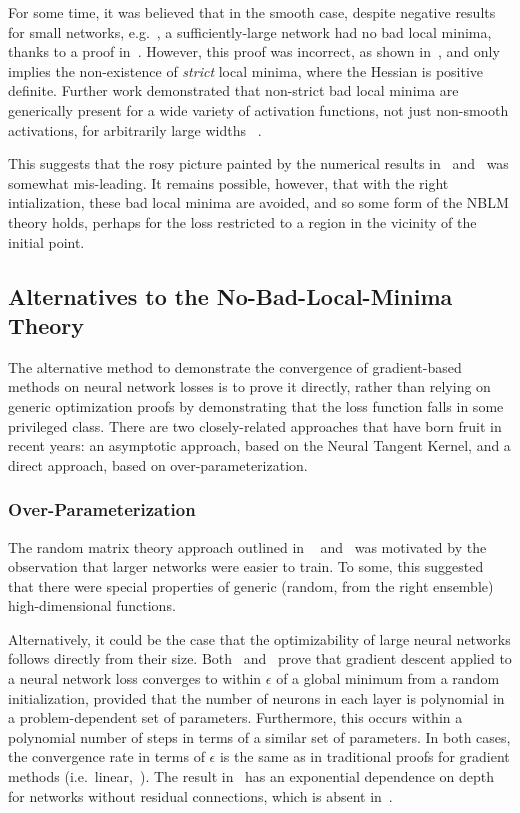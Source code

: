 \documentclass[../../thesis.tex]{subfiles}
\begin{document}
For some time, it was believed that in the smooth case,
despite negative results for small networks,
e.g.~\cite{auer1996},
a sufficiently-large network had
no bad local minima,
thanks to a proof in~\cite{yu1995}.
However, this proof was incorrect,
as shown in~\cite{li2018},
and only implies the non-existence of
\emph{strict} local minima,
where the Hessian is positive definite.
Further work demonstrated that non-strict bad local minima
are generically present for a wide variety of activation functions,
not just non-smooth activations,
for arbitrarily large widths%
~\cite{ding2019}.

This suggests that the rosy picture painted by the numerical results
in~\cite{dauphin2014} and~\cite{pennington2017}
was somewhat mis-leading.
It remains possible, however,
that with the right intialization,
these bad local minima
are avoided,
and so some form of the NBLM theory holds,
perhaps for the loss restricted to a region in the vicinity
of the initial point.

\subsection{Alternatives to the No-Bad-Local-Minima Theory}

The alternative method to
demonstrate the convergence of gradient-based methods
on neural network losses is to prove it directly,
rather than relying on generic optimization proofs
by demonstrating that the loss function falls in some
privileged class.
There are two closely-related approaches
that have born fruit in recent years:
an asymptotic approach, based on the Neural Tangent Kernel,
and a direct approach, based on over-parameterization.

\subsubsection{Over-Parameterization}

The random matrix theory approach outlined in%
~ and~
was motivated by the observation that larger networks
were easier to train.
To some, this suggested that there were special properties
of generic (random, from the right ensemble) high-dimensional functions.

Alternatively, it could be the case that the optimizability
of large neural networks follows directly from their size.
Both~\cite{allenzhu2018} and~\cite{du2018}
prove that gradient descent applied to a neural network loss
converges to within $\epsilon$ of a global minimum
from a random initialization,
provided that the number of
neurons in each layer is polynomial in a problem-dependent set of parameters.
Furthermore, this occurs
within a polynomial number of steps in terms of
a similar set of parameters.
In both cases, the convergence rate in terms of $\epsilon$
is the same as in traditional proofs for gradient methods
(i.e.~linear,~\cite{boyd2004}).
The result in~\cite{du2018} has an exponential dependence on depth for networks
without residual connections,
which is absent in~\cite{allenzhu2018}.
\end{document}
